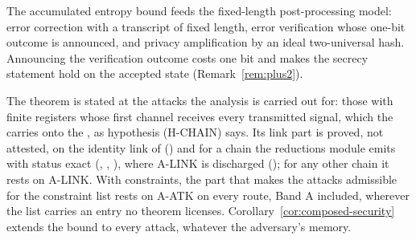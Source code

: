 The accumulated entropy bound feeds the fixed-length post-processing model:
error correction with a transcript of fixed length, error verification whose
one-bit outcome is announced, and privacy amplification by an ideal
two-universal hash. Announcing the verification outcome costs one bit and
makes the secrecy statement hold on the accepted state
(Remark~\ref{rem:plus2}).

The theorem is stated at the attacks the analysis is carried out for: those
with finite registers whose first channel receives every transmitted signal,
which the  carries onto the , as
hypothesis (H-CHAIN) says. Its link part is proved, not attested, on the
identity link of  () and for
a chain the reductions module emits with status exact
(, ,
), where A-LINK is discharged
(); for any other chain
it rests on A-LINK. With constraints, the part that makes the attacks
admissible for the constraint list rests on A-ATK on every route, Band A
included, wherever the list carries an entry no theorem licenses.
Corollary~\ref{cor:composed-security} extends the bound to every attack,
whatever the adversary's memory.

